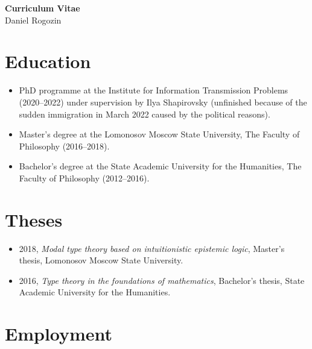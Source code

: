 \documentclass[11pt,a4paper]{article}
\begin{document}
\begin{center}
{\LARGE\textbf{Curriculum Vitae}}\\[0.3cm]
{\Large Daniel Rogozin}
\end{center}

\section{Education}

\begin{itemize}[leftmargin=*]
    \item PhD programme at the Institute for Information Transmission Problems (2020--2022) under supervision by Ilya Shapirovsky (unfinished because of the sudden immigration in March 2022 caused by the political reasons).
    \item Master's degree at the Lomonosov Moscow State University, The Faculty of Philosophy (2016--2018).
    \item Bachelor's degree at the State Academic University for the Humanities, The Faculty of Philosophy (2012--2016).
\end{itemize}

\section{Theses}

\begin{itemize}[leftmargin=*]
    \item 2018, \textit{Modal type theory based on intuitionistic epistemic logic}, Master's thesis, Lomonosov Moscow State University.
    \item 2016, \textit{Type theory in the foundations of mathematics}, Bachelor's thesis, State Academic University for the Humanities.
\end{itemize}

\section{Employment}
\end{document}
